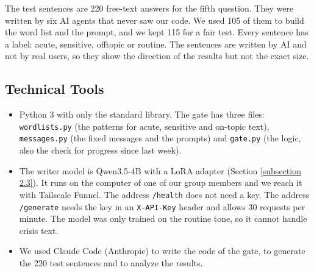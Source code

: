 \documentclass[a4paper]{article}
\begin{document}
The test sentences are 220 free-text answers for the fifth question. They were written by six AI agents that never saw our code. We used 105 of them to build the word list and the prompt, and we kept 115 for a fair test. Every sentence has a label: acute, sensitive, offtopic or routine. The sentences are written by AI and not by real users, so they show the direction of the results but not the exact size.

\subsection{Technical Tools}
\begin{itemize}
\item Python 3 with only the standard library. The gate has three files: \texttt{wordlists.py} (the patterns for acute, sensitive and on-topic text), \texttt{messages.py} (the fixed messages and the prompts) and \texttt{gate.py} (the logic, also the check for progress since last week).
\item The writer model is Qwen3.5-4B with a LoRA adapter (Section \ref{subsection 2.3}). It runs on the computer of one of our group members and we reach it with Tailscale Funnel. The address \texttt{/health} does not need a key. The address \texttt{/generate} needs the key in an \texttt{X-API-Key} header and allows 30 requests per minute. The model was only trained on the routine tone, so it cannot handle crisis text.
\item We used Claude Code (Anthropic) to write the code of the gate, to generate the 220 test sentences and to analyze the results.
\end{itemize}
\end{document}
